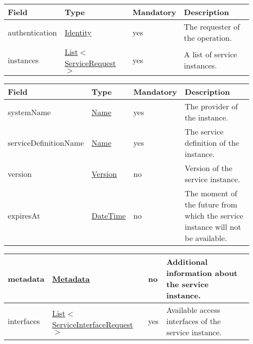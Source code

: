 \documentclass[a4paper]{arrowhead}
\newcommand{\pref}[1]{{\textcolor{ArrowheadGrey}{\hyperref[sec:model:primitives:#1]{#1}}}}
\begin{document}
 
\begin{table}[ht!]
\begin{tabularx}{\textwidth}{| p{2.5cm} | p{3.6cm} | p{2cm} | X |} \hline
\rowcolor{gray!33} Field & Type & Mandatory & Description \\ \hline
authentication & \hyperref[sec:model:Identity]{Identity} & yes & The requester of the operation. \\ \hline
instances & \pref{List}$<$\hyperref[sec:model:ServiceRequest]{ServiceRequest}$>$ & yes & A list of service instances. \\ \hline
\end{tabularx}
\end{table}

 
\begin{table}[ht!]
\begin{tabularx}{\textwidth}{| p{3.5cm} | p{4.9cm} | p{2cm} | X |} \hline
\rowcolor{gray!33} Field & Type & Mandatory & Description \\ \hline
systemName & \pref{Name} & yes & The provider of the instance. \\ \hline
serviceDefinitionName & \pref{Name} & yes & The service definition of the instance. \\ \hline
version & \pref{Version} & no & Version of the service instance. \\ \hline
expiresAt & \pref{DateTime} & no & The moment of the future from which the service instance will not be available. \\ \hline
\end{tabularx}
\end{table}

\begin{table}[ht!]
\begin{tabularx}{\textwidth}{| p{3.5cm} | p{4.9cm} | p{2cm} | X |} \hline
metadata &\hyperref[sec:model:Metadata]{Metadata} & no & Additional information about the service instance. \\ \hline
interfaces &  \pref{List}$<$\hyperref[sec:model:ServiceInterfaceRequest]{ServiceInterfaceRequest}$>$ & yes & Available access interfaces of the service instance.  \\ \hline
\end{tabularx}
\end{table}

 
\end{document}
